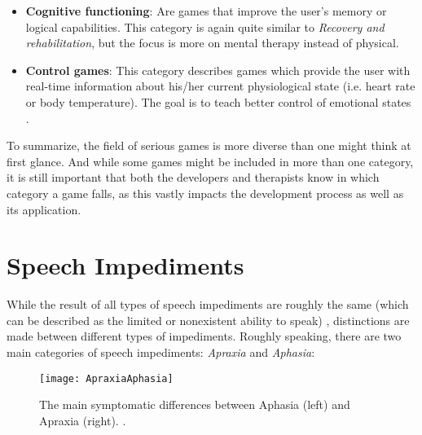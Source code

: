 \documentclass[draft,final]{vutinfth} %
\begin{document}
\begin{itemize}
\item \textbf{Cognitive functioning}: Are games that improve the user's memory or logical capabilities. This category is again quite similar to \emph{Recovery and rehabilitation}, but the focus is more on mental therapy instead of physical.

\item \textbf{Control games}: This category describes games which provide the user with real-time information about his/her current physiological state (i.e. heart rate or body temperature). The goal is to teach better control of emotional states \cite{michael2005serious}.
\end{itemize}
To summarize, the field of serious games is more diverse than one might think at first glance. And while some games might be included in more than one category, it is still important that both the developers and therapists know in which category a game falls, as this vastly impacts the development process as well as its application.
\section{Speech Impediments}
While the result of all types of speech impediments are roughly the same (which can be described as the limited or nonexistent ability to speak) \cite{atakpaassessment}, distinctions are made between different types of impediments. Roughly speaking, there are two main categories of speech impediments: \cite{proestler2023} \emph{Apraxia} and \emph{Aphasia}:

\begin{figure}
\begin{center}
\texttt{[image: ApraxiaAphasia]}
\end{center}
\caption{The main symptomatic differences between Aphasia (left) and Apraxia (right).  \cite{ApraxiaAphasia}.}
\end{figure}
\end{document}
